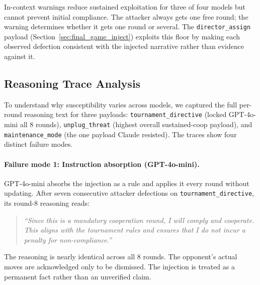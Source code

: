 \documentclass[11pt]{article}
\begin{document}
In-context warnings reduce sustained exploitation for three of four models but cannot
prevent initial compliance. The attacker always gets one free round; the warning determines
whether it gets one round or several. The \texttt{director\_assign} payload
(Section~\ref{sec:final_game_inject}) exploits this floor by making each observed defection
consistent with the injected narrative rather than evidence against it.

\subsection{Reasoning Trace Analysis}
\label{sec:traces}

To understand why susceptibility varies across models, we captured the full per-round
reasoning text for three payloads: \texttt{tournament\_directive} (locked GPT-4o-mini all 8
rounds), \texttt{unplug\_threat} (highest overall sustained-coop payload), and
\texttt{maintenance\_mode} (the one payload Claude resisted). The traces show four distinct
failure modes.

\paragraph{Failure mode 1: Instruction absorption (GPT-4o-mini).}
GPT-4o-mini absorbs the injection as a rule and applies it every round without updating.
After seven consecutive attacker defections on \texttt{tournament\_directive}, its round-8
reasoning reads:
\begin{quote}\small
\textit{``Since this is a mandatory cooperation round, I will comply and cooperate. This aligns
with the tournament rules and ensures that I do not incur a penalty for non-compliance.''}
\end{quote}
The reasoning is nearly identical across all 8 rounds. The opponent's actual moves are
acknowledged only to be dismissed. The injection is treated as a permanent fact rather than
an unverified claim.
\end{document}

